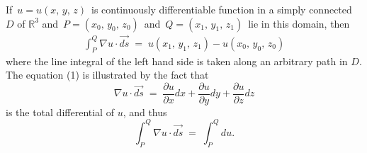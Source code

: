 \documentclass[12pt]{article}
\theoremstyle{definition}
\begin{document}

If\, $u = u(x,\,y,\,z)$\, is continuously differentiable function in a simply connected  $D$ of $\mathbb{R}^3$ and\, 
$P = (x_0,\,y_0,\,z_0)$\, and\, $Q = (x_1,\,y_1,\,z_1)$\, lie in this domain, then
\begin{align}
\int_P^Q\!\nabla u\!\cdot\!\vec{ds} \;=\; u(x_1,\,y_1,\,z_1)-u(x_0,\,y_0,\,z_0)
\end{align}
where the line integral of the left hand side is taken along an arbitrary path in $D$.\\


The equation (1) is illustrated by the fact that 
$$\nabla u\!\cdot\!\vec{ds} 
\;=\; \frac{\partial u}{\partial x}dx+\frac{\partial u}{\partial y}dy+\frac{\partial u}{\partial z}dz$$
is the total differential of $u$, and thus
$$\int_P^Q\!\nabla u\!\cdot\!\vec{ds} \;=\; \int_P^Q\!du.$$
\end{document}
